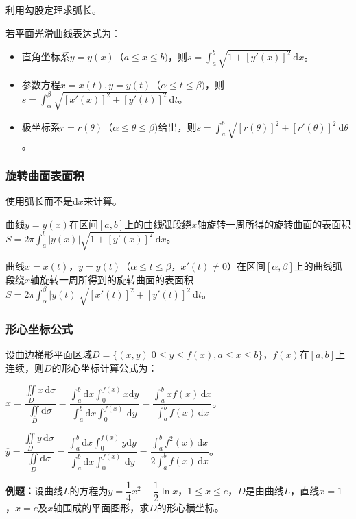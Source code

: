 \documentclass[UTF8, 12pt]{ctexart}
\begin{document}
利用勾股定理求弧长。

若平面光滑曲线表达式为：

\begin{itemize}
    \item 直角坐标系$y=y(x)$（$a\leqslant x\leqslant b)$，则$s=\int_a^b\sqrt{1+[y'(x)]^2}\,\textrm{d}x$。
    \item 参数方程$x=x(t),y=y(t)$（$\alpha\leqslant t\leqslant\beta)$，则$s=\int_\alpha^\beta\sqrt{[x'(x)]^2+[y'(t)]^2}\,\textrm{d}t$。
    \item 极坐标系$r=r(\theta)$（$\alpha\leqslant\theta\leqslant\beta)$给出，则$s=\int_a^b\sqrt{[r(\theta)]^2+[r'(\theta)]^2}\,\textrm{d}\theta$。
\end{itemize}

\subsubsection{旋转曲面表面积}

使用弧长而不是$\textrm{d}x$来计算。

曲线$y=y(x)$在区间$[a,b]$上的曲线弧段绕$x$轴旋转一周所得的旋转曲面的表面积$S=2\pi\int_a^b\vert y(x)\vert\sqrt{1+[y'(x)]^2}\,\textrm{d}x$。

曲线$x=x(t)$，$y=y(t)$（$\alpha\leqslant t\leqslant\beta$，$x'(t)\neq0$）在区间$[\alpha,\beta]$上的曲线弧段绕$x$轴旋转一周所得到的旋转曲面的表面积$S=2\pi\int_\alpha^\beta\vert y(t)\vert\sqrt{[x'(t)]^2+[y'(t)]^2}\,\textrm{d}t$。

\subsubsection{形心坐标公式}

设曲边梯形平面区域$D=\{(x,y)|0\leqslant y\leqslant f(x),a\leqslant x\leqslant b\}$，$f(x)$在$[a,b]$上连续，则$D$的形心坐标计算公式为：

$\overline{x}=\dfrac{\iint\limits_Dx\,\textrm{d}\sigma}{\iint\limits_D\textrm{d}\sigma}=\dfrac{\int_a^b\textrm{d}x\int_0^{f(x)}x\textrm{d}y}{\int_a^b\textrm{d}x\int_0^{f(x)}\,\textrm{d}y}=\dfrac{\int_a^bxf(x)\,\textrm{d}x}{\int_a^bf(x)\,\textrm{d}x}$。

$\overline{y}=\dfrac{\iint\limits_Dy\,\textrm{d}\sigma}{\iint\limits_D\textrm{d}\sigma}=\dfrac{\int_a^b\textrm{d}x\int_0^{f(x)}y\textrm{d}y}{\int_a^b\textrm{d}x\int_0^{f(x)}\,\textrm{d}y}=\dfrac{\int_a^bf^2(x)\,\textrm{d}x}{2\int_a^bf(x)\,\textrm{d}x}$。

\textbf{例题：}设曲线$L$的方程为$y=\dfrac{1}{4}x^2-\dfrac{1}{2}\ln x$，$1\leqslant x\leqslant e$，$D$是由曲线$L$，直线$x=1$，$x=e$及$x$轴围成的平面图形，求$D$的形心横坐标。
\end{document}
